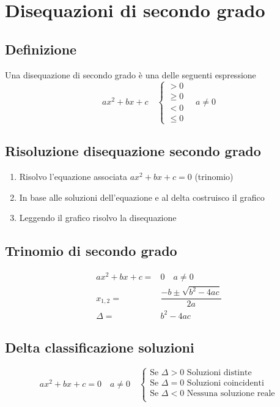\chapter{Disequazioni di secondo grado}
\section{Definizione}
Una disequazione di secondo grado è una delle seguenti espressione
\begin{equation*}
ax^2+bx+c\quad\begin{cases}
>0\\
\geq 0\\
<0\\
\leq 0
\end{cases}\quad a\neq 0
\end{equation*}
\section{Risoluzione disequazione secondo grado}
\begin{enumerate}
	\item Risolvo l'equazione associata $ax^2+bx+c=0$ (trinomio)
	\item In base alle soluzioni dell'equazione e al delta costruisco il grafico
	\item Leggendo il  grafico risolvo la disequazione
\end{enumerate}
\section{Trinomio di secondo grado}
\begin{align*}
ax^2+bx+c=&0\quad a\neq 0\\
x_{1,2}=&\dfrac{-b\pm\sqrt{b^2-4ac}}{2a}\\
\Delta=&b^2-4ac
\end{align*}
\section{Delta classificazione soluzioni}
\begin{equation*}
ax^2+bx+c=0\quad a\neq 0\quad\begin{cases}
\text{Se $\Delta >0$ Soluzioni distinte}\\
\text{Se $\Delta =0$ Soluzioni coincidenti}\\
\text{Se $\Delta <0$ Nessuna soluzione reale}\\
\end{cases}
\end{equation*}
